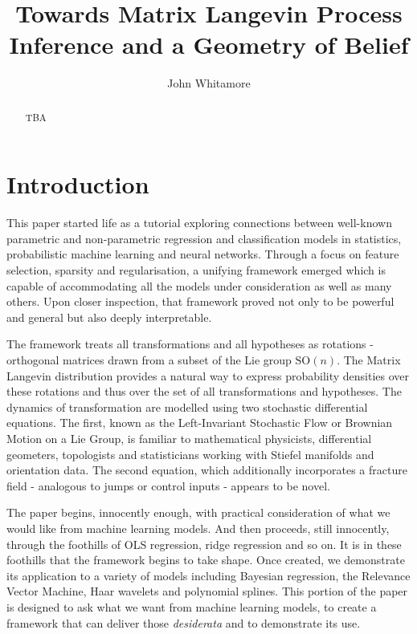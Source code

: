 \documentclass[11pt]{article}
\title{\textbf{Towards Matrix Langevin Process Inference and a Geometry of Belief}}
\author{John Whitamore}
\date{}
\begin{document}
	
	\maketitle
	
	\begin{abstract}
		TBA
	\end{abstract}
	
	\section{Introduction}
	
	This paper started life as a tutorial exploring connections between well-known parametric and non-parametric regression and classification models in statistics, probabilistic machine learning and neural networks. Through a focus on feature selection, sparsity and regularisation, a unifying framework emerged which is capable of accommodating all the models under consideration as well as many others. Upon closer inspection, that framework proved not only to be powerful and general but also deeply interpretable.
	
	The framework treats all transformations and all hypotheses as rotations - orthogonal matrices drawn from a subset of the Lie group $\mathrm{SO}(n)$. The Matrix Langevin distribution provides a natural way to express probability densities over these rotations and thus over the set of all transformations and hypotheses. The dynamics of transformation are modelled using two stochastic differential equations. The first, known as the Left-Invariant Stochastic Flow or Brownian Motion on a Lie Group, is familiar to mathematical physicists, differential geometers, topologists and statisticians working with Stiefel manifolds and orientation data. The second equation, which additionally incorporates a fracture field - analogous to jumps or control inputs - appears to be novel.
	
	The paper begins, innocently enough, with practical consideration of what we would like from machine learning models. And then proceeds, still innocently, through the foothills of OLS regression, ridge regression and so on. It is in these foothills that the framework begins to take shape. Once created, we demonstrate its application to a variety of models including Bayesian regression, the Relevance Vector Machine, Haar wavelets and polynomial splines. This portion of the paper is designed to ask what we want from machine learning models, to create a framework that can deliver those \emph{desiderata} and to demonstrate its use.
	
\end{document}
